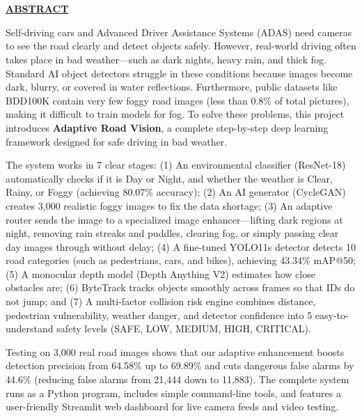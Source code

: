 \documentclass{article}
\begin{document}
\newpage
\section*{} %
\begin{center}
\underline{\LARGE \textbf{ABSTRACT}}\\[1.5cm]
\end{center}
\vspace{0.5cm}

\noindent Self-driving cars and Advanced Driver Assistance Systems (ADAS) need cameras to see the road clearly and detect objects safely. However, real-world driving often takes place in bad weather—such as dark nights, heavy rain, and thick fog. Standard AI object detectors struggle in these conditions because images become dark, blurry, or covered in water reflections. Furthermore, public datasets like BDD100K contain very few foggy road images (less than 0.8\% of total pictures), making it difficult to train models for fog. To solve these problems, this project introduces \textbf{Adaptive Road Vision}, a complete step-by-step deep learning framework designed for safe driving in bad weather. 

The system works in 7 clear stages: (1) An environmental classifier (ResNet-18) automatically checks if it is Day or Night, and whether the weather is Clear, Rainy, or Foggy (achieving 80.07\% accuracy); (2) An AI generator (CycleGAN) creates 3,000 realistic foggy images to fix the data shortage; (3) An adaptive router sends the image to a specialized image enhancer—lifting dark regions at night, removing rain streaks and puddles, clearing fog, or simply passing clear day images through without delay; (4) A fine-tuned YOLO11s detector detects 10 road categories (such as pedestrians, cars, and bikes), achieving 43.34\% mAP@50; (5) A monocular depth model (Depth Anything V2) estimates how close obstacles are; (6) ByteTrack tracks objects smoothly across frames so that IDs do not jump; and (7) A multi-factor collision risk engine combines distance, pedestrian vulnerability, weather danger, and detector confidence into 5 easy-to-understand safety levels (SAFE, LOW, MEDIUM, HIGH, CRITICAL). 

Testing on 3,000 real road images shows that our adaptive enhancement boosts detection precision from 64.58\% up to 69.89\% and cuts dangerous false alarms by 44.6\% (reducing false alarms from 21,444 down to 11,883). The complete system runs as a Python program, includes simple command-line tools, and features a user-friendly Streamlit web dashboard for live camera feeds and video testing.
\end{document}
